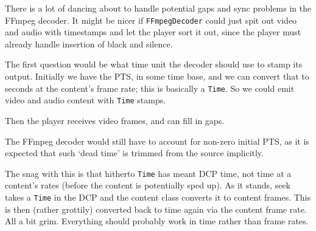 \documentclass{article}
\begin{document}
There is a lot of dancing about to handle potential gaps and sync
problems in the FFmpeg decoder.  It might be nicer if
\texttt{FFmpegDecoder} could just spit out video and audio with
timestamps and let the player sort it out, since the player must
already handle insertion of black and silence.

The first question would be what time unit the decoder should use to
stamp its output.  Initially we have the PTS, in some time base, and
we can convert that to seconds at the content's frame rate; this is
basically a \texttt{Time}.  So we could emit video and audio content
with \texttt{Time} stamps.

Then the player receives video frames, and can fill in gaps.

The FFmpeg decoder would still have to account for non-zero initial
PTS, as it is expected that such `dead time' is trimmed from the
source implicitly.

The snag with this is that hitherto \texttt{Time} has meant DCP time,
not time at a content's rates (before the content is potentially sped
up).  As it stands, seek takes a \texttt{Time} in the DCP and the
content class converts it to content frames.  This is then (rather
grottily) converted back to time again via the content frame rate.
All a bit grim.  Everything should probably work in time rather than
frame rates.
\end{document}
